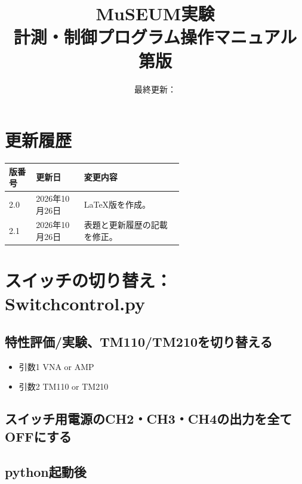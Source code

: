 \documentclass[a4paper,11pt]{ltjsarticle}
\title{MuSEUM実験\\計測・制御プログラム操作マニュアル\\[0.5em]\large 第\documentversion 版}
\author{}
\date{最終更新：\documentupdated}
\begin{document}
\maketitle
\section*{更新履歴}
\begin{tabular}{@{}llp{0.58\linewidth}@{}}
\hline
版番号 & 更新日 & 変更内容 \\
\hline
2.0 & 2026年10月26日 & LaTeX版を作成。 \\
2.1 & 2026年10月26日 & 表題と更新履歴の記載を修正。 \\
\hline
\end{tabular}
\clearpage
\tableofcontents
\clearpage


\section{スイッチの切り替え：Switchcontrol.py}

\subsection{特性評価/実験、TM110/TM210を切り替える}

\begin{command}


\end{command}

\begin{itemize}

\item 引数1 VNA or AMP

\item 引数2 TM110 or TM210

\end{itemize}

\subsection{スイッチ用電源のCH2・CH3・CH4の出力を全てOFFにする}

\begin{command}


\end{command}

\subsection{python起動後}
\end{document}
